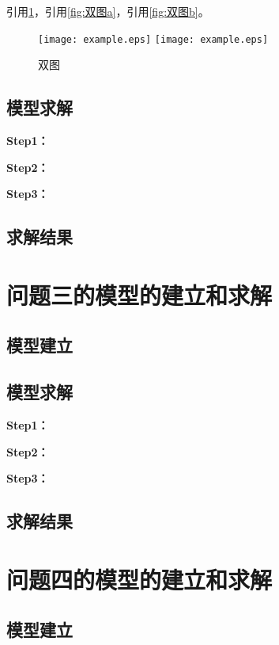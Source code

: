 \documentclass[withoutpreface,bwprint]{cumcmthesis}
\begin{document}
引用\cref{fig:双图}，引用\cref{fig:双图a}，引用\cref{fig:双图b}。

\begin{figure}[ht]
\centering
{}
{\texttt{[image: example.eps]}}
{\texttt{[image: example.eps]}}
\caption{双图}\label{fig:双图}
\end{figure} 

\subsection{模型求解}

\textbf{Step1：} 

\textbf{Step2：} 

\textbf{Step3：} 

\subsection{求解结果}


\section{问题三的模型的建立和求解}
\subsection{模型建立}

\subsection{模型求解}

\textbf{Step1：} 

\textbf{Step2：} 

\textbf{Step3：} 

\subsection{求解结果}


\section{问题四的模型的建立和求解}
\subsection{模型建立}
\end{document}
